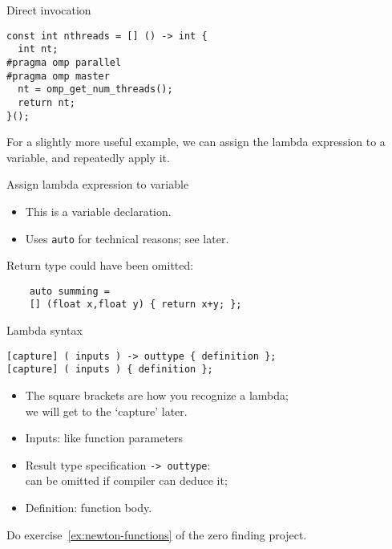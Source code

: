 \begin{block}{Direct invocation}
  \label{sl:lambda-omp}
    \lstset{numbers=left,numberstyle=\tiny}
\begin{lstlisting}
const int nthreads = [] () -> int {
  int nt;
#pragma omp parallel
#pragma omp master
  nt = omp_get_num_threads();
  return nt;
}();
\end{lstlisting}
\end{block}

For a slightly more useful example,
we can assign the lambda expression to a variable, and repeatedly apply it.

\begin{block}{Assign lambda expression to variable}
  \label{sl:lambdavar}
\begin{itemize}
\item This is a variable declaration.
\item Uses \lstinline+auto+ for technical reasons; see later.
\end{itemize}
Return type could have been omitted:
\begin{lstlisting}
    auto summing = 
    [] (float x,float y) { return x+y; };
\end{lstlisting}
\end{block}

\begin{slide}{Lambda syntax}
  \label{sl:lambda-syntax}
\begin{lstlisting}
[capture] ( inputs ) -> outtype { definition };
[capture] ( inputs ) { definition };  
\end{lstlisting}
  \begin{itemize}
  \item The square brackets are how you recognize a lambda;\\
    we will get to the `capture' later.
  \item Inputs: like function parameters
  \item Result type specification \lstinline+-> outtype+:\\
    can be omitted if compiler can deduce it;
  \item Definition: function body.
  \end{itemize}
\end{slide}

\begin{exercise}
  Do exercise~\ref{ex:newton-functions} of the zero finding project.
\end{exercise}

